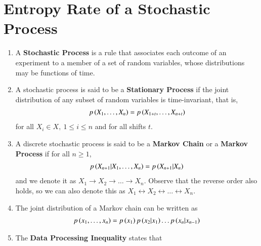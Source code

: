 \documentclass[journal,12pt,twocolumn]{IEEEtran}
\renewcommand\thesection{\arabic{section}}
\begin{document}
\section{Entropy Rate of a Stochastic Process}
\begin{enumerate}[label=\thesection.\arabic*, ref=\thesection.\theenumi]
    \item A \textbf{Stochastic Process} is a rule that associates each outcome 
    of an experiment to a member of a set of random variables, whose 
    distributions may be functions of time.
    \item A stochastic process is said to be a \textbf{Stationary Process} 
    if the joint distribution of any subset of random variables is 
    time-invariant, that is,
    \begin{align}
        p\left(X_1,\ldots,X_n\right) = p\left(X_{1+t},\ldots,X_{n+t}\right)
        \label{eq:def-stat}
    \end{align}
    for all $X_i \in X,\ 1 \le i \le n$ and for all shifts $t$.
    \item A discrete stochastic process is said to be a \textbf{Markov Chain}
    or a \textbf{Markov Process} if for all $n \ge 1$,
    \begin{align}
        p\left(X_{n+1}|X_1,\ldots,X_n\right) = p\left(X_{n+1}|X_n\right)
        \label{eq:def-markov}
    \end{align}
    and we denote it as $X_1 \rightarrow X_2 \rightarrow \ldots \rightarrow X_n$.
    Observe that the reverse order also holds, so we can also denote this as 
    $X_1 \leftrightarrow X_2 \leftrightarrow \ldots \leftrightarrow X_n$.
    \item The joint distribution of a Markov chain can be written as
    \begin{align}
        p\left(x_1,\ldots,x_n\right) = p\left(x_1\right)p\left(x_2|x_1\right)\ldots p\left(x_n|x_{n-1}\right)
        \label{eq:joint-markov}
    \end{align}
    \item The \textbf{Data Processing Inequality} states that 
\end{enumerate}
\end{document}
